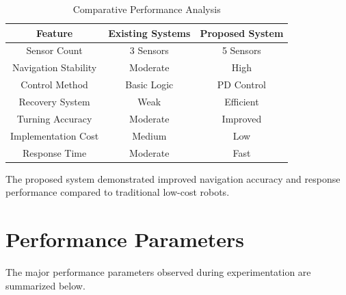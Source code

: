\documentclass[12pt,a4paper,oneside]{report}
\begin{document}
\begin{table}[H]
\centering
\caption{Comparative Performance Analysis}

\begin{tabular}{|c|c|c|}
\hline

\textbf{Feature} &
\textbf{Existing Systems} &
\textbf{Proposed System} \\

\hline

Sensor Count & 3 Sensors & 5 Sensors \\

Navigation Stability & Moderate & High \\

Control Method & Basic Logic & PD Control \\

Recovery System & Weak & Efficient \\

Turning Accuracy & Moderate & Improved \\

Implementation Cost & Medium & Low \\

Response Time & Moderate & Fast \\

\hline

\end{tabular}

\end{table}

The proposed system demonstrated improved navigation accuracy and response performance compared to traditional low-cost robots.


\section{Performance Parameters}

The major performance parameters observed during experimentation are summarized below.

\end{document}
